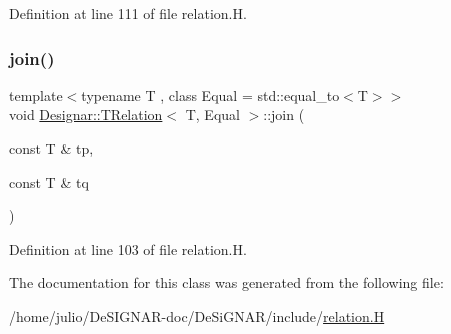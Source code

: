 Definition at line 111 of file relation.\+H.

\mbox{\label{class_designar_1_1_t_relation_a484b21a54f5d2b9862487fbb8b5ac1e7}} 
\subsubsection{\texorpdfstring{join()}{join()}}
{\footnotesize\ttfamily template$<$typename T , class Equal  = std\+::equal\+\_\+to$<$\+T$>$$>$ \\
void \hyperlink{class_designar_1_1_t_relation}{Designar\+::\+T\+Relation}$<$ T, Equal $>$\+::join (\begin{DoxyParamCaption}\item[{const T \&}]{tp,  }\item[{const T \&}]{tq }\end{DoxyParamCaption})\hspace{0.3cm}{\ttfamily [inline]}}



Definition at line 103 of file relation.\+H.



The documentation for this class was generated from the following file\+:\begin{DoxyCompactItemize}
\item 
/home/julio/\+De\+S\+I\+G\+N\+A\+R-\/doc/\+De\+Si\+G\+N\+A\+R/include/\hyperlink{relation_8_h}{relation.\+H}\end{DoxyCompactItemize}
